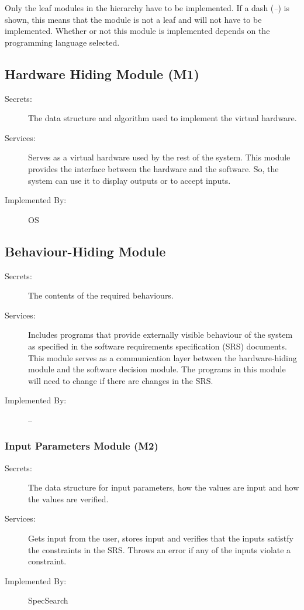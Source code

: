 \documentclass[12pt, titlepage]{article}
\begin{document}
Only the leaf modules in the
hierarchy have to be implemented. If a dash (\emph{--}) is shown, this means
that the module is not a leaf and will not have to be implemented. Whether or
not this module is implemented depends on the programming language
selected.

\subsection{Hardware Hiding Module (M1)}

\begin{description}
\item[Secrets:]The data structure and algorithm used to implement the virtual
  hardware.
\item[Services:]Serves as a virtual hardware used by the rest of the
  system. This module provides the interface between the hardware and the
  software. So, the system can use it to display outputs or to accept inputs.
\item[Implemented By:] OS
\end{description}

\subsection{Behaviour-Hiding Module }

\begin{description}
\item[Secrets:]The contents of the required behaviours.
\item[Services:]Includes programs that provide externally visible behaviour of
  the system as specified in the software requirements specification (SRS)
  documents. This module serves as a communication layer between the
  hardware-hiding module and the software decision module. The programs in this
  module will need to change if there are changes in the SRS.
\item[Implemented By:] --
\end{description}

\subsubsection{Input Parameters Module (M2)}

\begin{description}
	\item[Secrets:] The data structure for input parameters, how the values are 
	input and how the values are verified. 
	\item[Services:] Gets input from the user, stores input and verifies that 
	the inputs satistfy the constraints in the SRS. Throws an error if any of 
	the inputs violate a constraint. 
	\item[Implemented By:]SpecSearch 
\end{description} 
\end{document}
